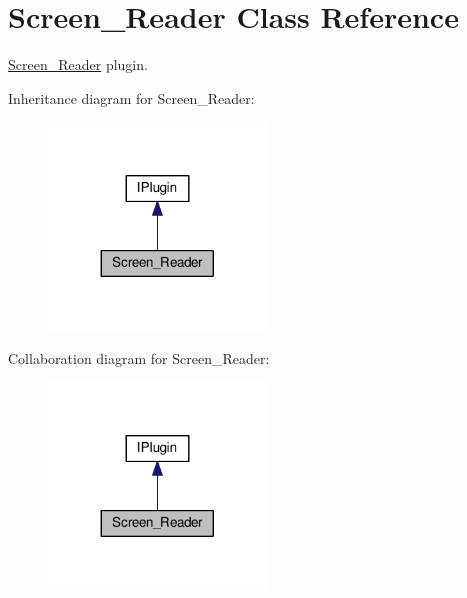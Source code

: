 \hypertarget{class_screen___reader}{}\section{Screen\+\_\+\+Reader Class Reference}
\label{class_screen___reader}


\hyperlink{class_screen___reader}{Screen\+\_\+\+Reader} plugin.  




Inheritance diagram for Screen\+\_\+\+Reader\+:\nopagebreak
\begin{figure}[H]
\begin{center}
\leavevmode
\includegraphics[width=164pt]{class_screen___reader__inherit__graph}
\end{center}
\end{figure}


Collaboration diagram for Screen\+\_\+\+Reader\+:\nopagebreak
\begin{figure}[H]
\begin{center}
\leavevmode
\includegraphics[width=164pt]{class_screen___reader__coll__graph}
\end{center}
\end{figure}
